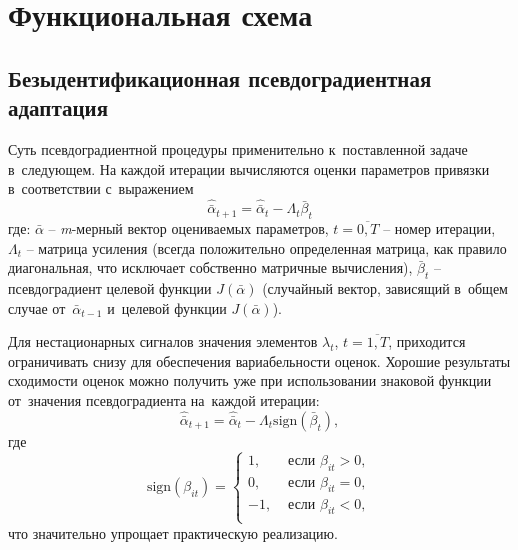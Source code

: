 \chapter{Функциональная схема}
\section{Безыдентификационная псевдоградиентная адаптация}
Суть псевдоградиентной процедуры применительно к~поставленной задаче в~следующем. На каждой итерации вычисляются оценки параметров привязки в~соответствии с~выражением
\[
\hat{\bar{\alpha}}_{t+1}=\hat{\bar{\alpha}}_{t}-\Lambda_{t}\bar{\beta}_{t}
\]
где: $\bar{\alpha}$ -- \textit{m}-мерный вектор оцениваемых параметров, $t=\overline{0,T}$ -- номер итерации, $\Lambda_{t}$ -- матрица усиления (всегда положительно определенная матрица, как правило диагональная, что исключает собственно матричные вычисления), $\bar{\beta}_{t}$ -- псевдоградиент целевой функции $J(\bar{\alpha})$ (случайный вектор, зависящий в~общем случае от~$\bar{\alpha}_{t-1}$ и~целевой функции $J(\bar{\alpha})$).

Для нестационарных сигналов значения элементов $\lambda_{t}$, $t=\overline{1,T}$, приходится ограничивать снизу для обеспечения вариабельности оценок. Хорошие результаты сходимости оценок можно получить уже при использовании знаковой функции от~значения псевдоградиента на~каждой итерации:
\[
\hat{\bar{\alpha}}_{t+1}=\hat{\bar{\alpha}}_{t}-\Lambda_{t}\text{sign}(\bar{\beta}_{t}),
\]
где
\[
\text{sign}(\beta_{it})= 
\left\{
	\begin{aligned}
		1, &\text{ если } \beta_{it} > 0, \\
		0, &\text{ если } \beta_{it} = 0, \\
		-1, &\text{ если } \beta_{it} < 0, \\
	\end{aligned}
\right.
\]
что значительно упрощает практическую реализацию. 